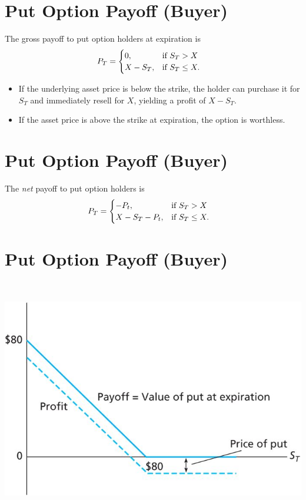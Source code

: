 \documentclass[letterpaper,10pt,english]{sphinxmanual}
\begin{document}
\section{Put Option Payoff (Buyer)}
\label{options:put-option-payoff-buyer}
The gross payoff to put option holders at expiration is
\begin{gather}
\begin{split}P_T & = \begin{cases} 0, & \text{if  } S_T > X
\\ X - S_T, & \text{if  } S_T \leq X. \end{cases}\end{split}\notag
\end{gather}\begin{itemize}
\item {} 
If the underlying asset price is below the strike, the holder can
purchase it for $S_T$ and immediately resell for $X$,
yielding a profit of $X-S_T$.

\end{itemize}
\begin{itemize}
\item {} 
If the asset price is above the strike at expiration, the option is
worthless.

\end{itemize}


\section{Put Option Payoff (Buyer)}
\label{options:id10}
The \emph{net} payoff to put option holders is
\begin{gather}
\begin{split}P_T & = \begin{cases} -P_t, & \text{if  } S_T > X
\\ X - S_T - P_t, & \text{if  } S_T \leq X. \end{cases}\end{split}\notag
\end{gather}

\section{Put Option Payoff (Buyer)}
\label{options:id11}
$\qquad$

\includegraphics[width=6in]{bod34698_1504_lg.jpg}
\end{document}

